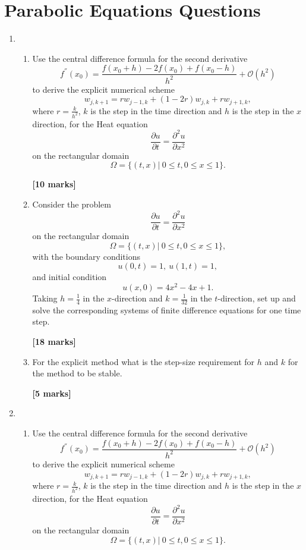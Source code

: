 \section{Parabolic Equations Questions}
\begin{enumerate}
\section{Explicit Equations}
	\item 
\begin{enumerate}
	
	\item 
	Use the central difference formula for the second derivative 
	\[ f^{''}(x_0)=\frac{f(x_0+h)-2f(x_0)+f(x_0-h)}{h^2}+\mathcal{O}(h^2)\]
	to derive the explicit numerical scheme
	\[w_{j,k+1}=rw_{j-1,k}+(1-2r)w_{j,k}+rw_{j+1,k},\]
	where $r=\frac{k}{h^2}$, $k$ is the step in the time direction and $h$ is the step in the $x$ direction, 
	for the Heat equation 
	\[\frac{\partial u}{\partial t}=\frac{\partial^2 u}{\partial x^2} \]
	on the rectangular domain
	\[\Omega=\{(t,x)| \ 0\leq t, 0 \leq x \leq 1\}. \]
\begin{flushright}
\textbf{[10 marks]}
\end{flushright}
	
	\item Consider the problem
	\[\frac{\partial u}{\partial t}=\frac{\partial^2 u}{\partial x^2} \]
	on the rectangular domain
	\[\Omega=\{(t,x)| \ 0\leq t, 0 \leq x \leq 1\}, \]
	with the boundary conditions
	\[ u(0,t)=1, \ u(1,t)=1,   \]
	and initial condition
	\[	u(x,0)=4x^2-4x+1.\]
		Taking $h=\frac{1}{4}$ in the $x$-direction and $k=\frac{1}{32}$ in the $t$-direction, set up and solve the corresponding systems of finite difference equations for one time step.\\
\begin{flushright}
\textbf{[18 marks]}
\end{flushright}
	\item
	For the explicit method what is the step-size requirement for $h$ and $k$ for the method to be stable.
\begin{flushright}
\textbf{[5 marks]}
\end{flushright}
	
	
\end{enumerate}

	\item 
\begin{enumerate}
	
	\item 
	Use the central difference formula for the second derivative 
	\[ f^{''}(x_0)=\frac{f(x_0+h)-2f(x_0)+f(x_0-h)}{h^2}+\mathcal{O}(h^2)\]
	to derive the explicit numerical scheme
	\[w_{j,k+1}=rw_{j-1,k}+(1-2r)w_{j,k}+rw_{j+1,k},\]
	where $r=\frac{k}{h^2}$, $k$ is the step in the time direction and $h$ is the step in the $x$ direction, 
	for the Heat equation 
	\[\frac{\partial u}{\partial t}=\frac{\partial^2 u}{\partial x^2} \]
	on the rectangular domain
	\[\Omega=\{(t,x)| \ 0\leq t, 0 \leq x \leq 1\}. \]


\end{enumerate}
\end{enumerate}
